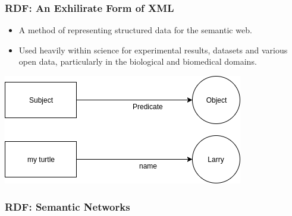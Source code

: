 \documentclass{beamer}
\begin{document}
\begin{frame}
\frametitle{RDF: An Exhilirate Form of XML}

\begin{itemize}
  \item A method of representing structured data for the semantic web.
  \item Used heavily within science for experimental results, datasets and
  various open data, particularly in the biological and biomedical domains.
\end{itemize}

\includegraphics[width=\textwidth]{two.png}
\end{frame}

\begin{frame}
\frametitle{RDF: Semantic Networks}
\end{frame}
\end{document}
